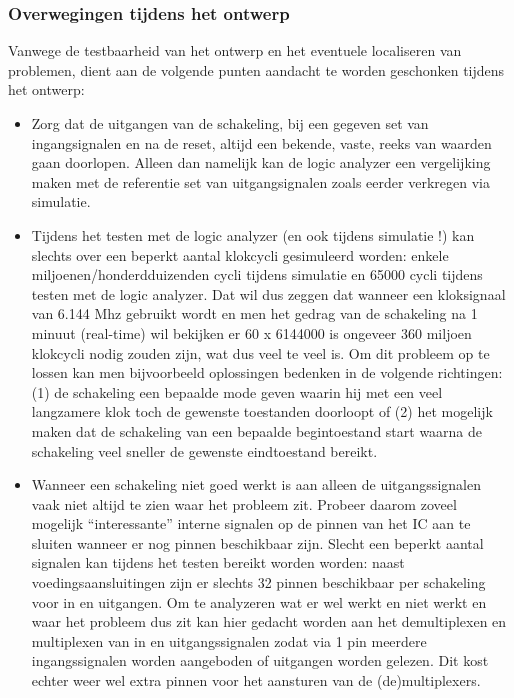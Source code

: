 \subsubsection{Overwegingen tijdens het ontwerp}
Vanwege de testbaarheid van het ontwerp en het eventuele localiseren van problemen, 
dient aan de volgende punten aandacht te worden geschonken tijdens het ontwerp:
\begin{itemize}
\item
Zorg dat de uitgangen van de schakeling, bij een gegeven set van ingangsignalen
en na de reset, altijd een bekende, vaste, reeks van waarden gaan doorlopen. 
Alleen dan namelijk kan de logic analyzer een vergelijking maken met de 
referentie set van uitgangsignalen zoals eerder verkregen via simulatie.
\item
Tijdens het testen met de logic analyzer (en ook tijdens simulatie !) 
kan slechts over een beperkt aantal klokcycli gesimuleerd worden: enkele 
miljoenen/honderdduizenden cycli tijdens simulatie en 65000 cycli tijdens 
testen met de logic analyzer. 
Dat wil dus zeggen dat wanneer een kloksignaal van 6.144 Mhz gebruikt wordt 
en men het gedrag van de schakeling na 1 minuut (real-time) wil bekijken 
er 60 x 6144000 is ongeveer 360 miljoen klokcycli nodig zouden zijn, wat dus veel te veel is.
Om dit probleem op te lossen kan men bijvoorbeeld oplossingen bedenken in de volgende richtingen:
(1) de schakeling een bepaalde mode geven waarin hij met een veel langzamere klok 
toch de gewenste toestanden doorloopt of 
(2) het mogelijk maken dat de schakeling van een bepaalde begintoestand start 
waarna de schakeling veel sneller de gewenste eindtoestand bereikt.
\item
Wanneer een schakeling niet goed werkt is aan alleen de uitgangssignalen 
vaak niet altijd te zien waar het probleem zit.  
Probeer daarom zoveel mogelijk ``interessante'' interne signalen op de pinnen van het 
IC aan te sluiten wanneer er nog pinnen beschikbaar zijn. 
Slecht een beperkt aantal signalen kan tijdens het testen bereikt worden worden: 
naast voedingsaansluitingen zijn er slechts 32 pinnen beschikbaar per schakeling voor in 
en uitgangen. 
Om te analyzeren wat er wel werkt en niet werkt en waar het probleem dus zit kan hier 
gedacht worden aan het demultiplexen en multiplexen van in en uitgangssignalen 
zodat via 1 pin meerdere ingangssignalen worden aangeboden of uitgangen worden gelezen. 
Dit kost echter weer wel extra pinnen voor het aansturen van de (de)multiplexers.
\end{itemize}
